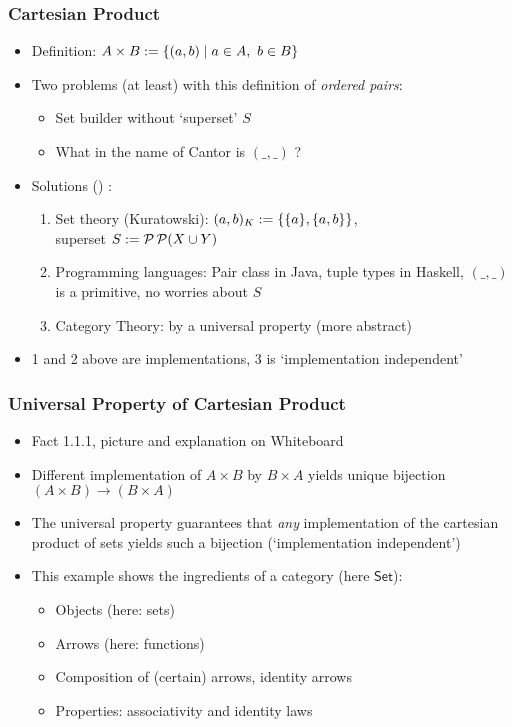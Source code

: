 \documentclass[handout]{beamer}
\newcommand{\Set}{\mathsf{Set}}
\begin{document}
\frame
  {   
    \frametitle{Cartesian Product}\label{Ch1:CartesianProduct}

 \begin{itemize}[<+->]
\item Definition: $A\times B := \{(a,b) \mid a\in A,~b\in B\}$
\item Two problems (at least) with this definition of \emph{ordered pairs}:
   \begin{itemize}[<+->]
\item Set builder without `superset' $S$
\item What in the name of Cantor is $(\_,\_)$ ?
   \end{itemize}
\item Solutions  () :
 \begin{enumerate}[<+->]
\item Set theory (Kuratowski): $(a,b)_K := \{\{a\},\{a,b\}\}$, \\
           superset $S:= \operatorname{\mathcal{P}}\operatorname{\mathcal{P}}(X\cup Y)$
\item Programming languages: Pair class in Java, tuple types in Haskell,
$(\_,\_)$ is a primitive, no worries about $S$
\item Category Theory: by a universal property (more abstract)
 \end{enumerate}
\item 1 and 2 above are implementations, 3 is `implementation independent'
 \end{itemize}

 }


\frame
  {   
    \frametitle{Universal Property of Cartesian Product}\label{Ch1:CartesianProductUP}

 \begin{itemize}[<+->]
\item Fact 1.1.1, picture and explanation on Whiteboard
\item Different implementation of $A\times B$ by $B\times A$ yields unique bijection
$(A\times B) \to (B\times A)$
\item The universal property guarantees that \emph{any} implementation
of the cartesian product of sets yields such a bijection (`implementation independent')
\item This example shows the ingredients of a category (here $\Set$):
   \begin{itemize}[<+->]
\item Objects (here: sets)
\item Arrows (here: functions)
\item Composition of (certain) arrows, identity arrows
\item Properties: associativity and identity laws
   \end{itemize}
 \end{itemize}

 }
\end{document}
